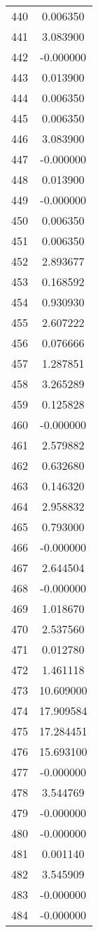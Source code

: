\documentclass[12pt]{article}
\begin{document}
\begin{longtable}{@{}cc@{}}
440 & 0.006350 \\
441 & 3.083900 \\
442 & -0.000000 \\
443 & 0.013900 \\
444 & 0.006350 \\
445 & 0.006350 \\
446 & 3.083900 \\
447 & -0.000000 \\
448 & 0.013900 \\
449 & -0.000000 \\
450 & 0.006350 \\
451 & 0.006350 \\
452 & 2.893677 \\
453 & 0.168592 \\
454 & 0.930930 \\
455 & 2.607222 \\
456 & 0.076666 \\
457 & 1.287851 \\
458 & 3.265289 \\
459 & 0.125828 \\
460 & -0.000000 \\
461 & 2.579882 \\
462 & 0.632680 \\
463 & 0.146320 \\
464 & 2.958832 \\
465 & 0.793000 \\
466 & -0.000000 \\
467 & 2.644504 \\
468 & -0.000000 \\
469 & 1.018670 \\
470 & 2.537560 \\
471 & 0.012780 \\
472 & 1.461118 \\
473 & 10.609000 \\
474 & 17.909584 \\
475 & 17.284451 \\
476 & 15.693100 \\
477 & -0.000000 \\
478 & 3.544769 \\
479 & -0.000000 \\
480 & -0.000000 \\
481 & 0.001140 \\
482 & 3.545909 \\
483 & -0.000000 \\
484 & -0.000000 \\

\end{longtable}
\end{document}
